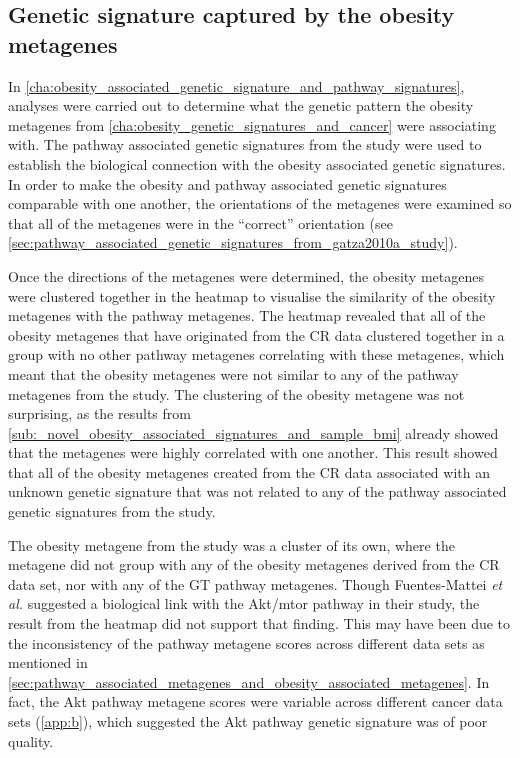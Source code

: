 \subsection{Genetic signature captured by the obesity metagenes}
\label{sub:genetic_signature_captured_by_the_obesity_metagenes}

In \cref{cha:obesity_associated_genetic_signature_and_pathway_signatures}, analyses were carried out to determine what the genetic pattern the obesity metagenes from \cref{cha:obesity_genetic_signatures_and_cancer} were associating with.
The pathway associated genetic signatures from the \citet{Gatza2010a} study were used to establish the biological connection with the obesity associated genetic signatures.
In order to make the obesity and pathway associated genetic signatures comparable with one another, the orientations of the metagenes were examined so that all of the metagenes were in the ``correct'' orientation (see \cref{sec:pathway_associated_genetic_signatures_from_gatza2010a_study}).

Once the directions of the metagenes were determined, the obesity metagenes were clustered together in the heatmap to visualise the similarity of the obesity metagenes with the pathway metagenes.
The heatmap revealed that all of the obesity metagenes that have originated from the CR data clustered together in a group with no other pathway metagenes correlating with these metagenes, which meant that the obesity metagenes were not similar to any of the pathway metagenes from the \citet{Gatza2010a} study.
The clustering of the obesity metagene was not surprising, as the results from \cref{sub:_novel_obesity_associated_signatures_and_sample_bmi} already showed that the metagenes were highly correlated with one another.
This result showed that all of the obesity metagenes created from the CR data associated with an unknown genetic signature that was not related to any of the pathway associated genetic signatures from the \citet{Gatza2010a} study.

The obesity metagene from the \citet{Fuentes-Mattei2014} study was a cluster of its own, where the metagene did not group with any of the obesity metagenes derived from the CR data set, nor with any of the GT pathway metagenes.
Though Fuentes-Mattei \textit{et al.} suggested a biological link with the Akt/\gls{mtor} pathway in their study, the result from the heatmap did not support that finding.
This may have been due to the inconsistency of the pathway metagene scores across different data sets as mentioned in \cref{sec:pathway_associated_metagenes_and_obesity_associated_metagenes}.
In fact, the Akt pathway metagene scores were variable across different cancer data sets (\cref{app:b}), which suggested the Akt pathway genetic signature was of poor quality.

